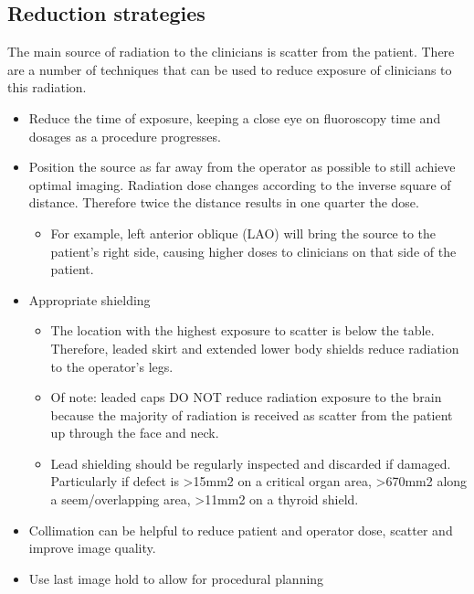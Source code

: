 \documentclass[
]{book}
\providecommand{\tightlist}{%
  \setlength{\itemsep}{0pt}\setlength{\parskip}{0pt}}
\begin{document}
\hypertarget{reduction-strategies}{%
\subsection{Reduction strategies}\label{reduction-strategies}}

The main source of radiation to the clinicians is scatter from the
patient. There are a number of techniques that can be used to reduce
exposure of clinicians to this radiation.\citep{heidbuchel2014, kirkwood2013}

\begin{itemize}
\item
  Reduce the time of exposure, keeping a close eye on fluoroscopy time
  and dosages as a procedure progresses.
\item
  Position the source as far away from the operator as possible to
  still achieve optimal imaging. Radiation dose changes according to
  the inverse square of distance. Therefore twice the distance results
  in one quarter the dose.

  \begin{itemize}
  \tightlist
  \item
    For example, left anterior oblique (LAO) will bring the source
    to the patient's right side, causing higher doses to clinicians
    on that side of the patient.\citep{kirkwood2013, sailer2019}
  \end{itemize}
\item
  Appropriate shielding

  \begin{itemize}
  \item
    The location with the highest exposure to scatter is below the
    table.\citep{gonzales2014, miller2010} Therefore, leaded skirt and
    extended lower body shields reduce radiation to the operator's
    legs.\citep{kirkwood2015}
  \item
    Of note: leaded caps DO NOT reduce radiation exposure to the
    brain because the majority of radiation is received as scatter
    from the patient up through the face and neck.\citep{kirkwood2018}
  \item
    Lead shielding should be regularly inspected and discarded if
    damaged. Particularly if defect is \textgreater15mm2 on a critical organ
    area, \textgreater670mm2 along a seem/overlapping area, \textgreater11mm2 on a
    thyroid shield.\citep{officeofhealthcareinspections2014, university}
  \end{itemize}
\item
  Collimation can be helpful to reduce patient and operator dose,
  scatter and improve image quality.\citep{haqqani2012}
\item
  Use last image hold to allow for procedural planning
\end{itemize}
\end{document}
